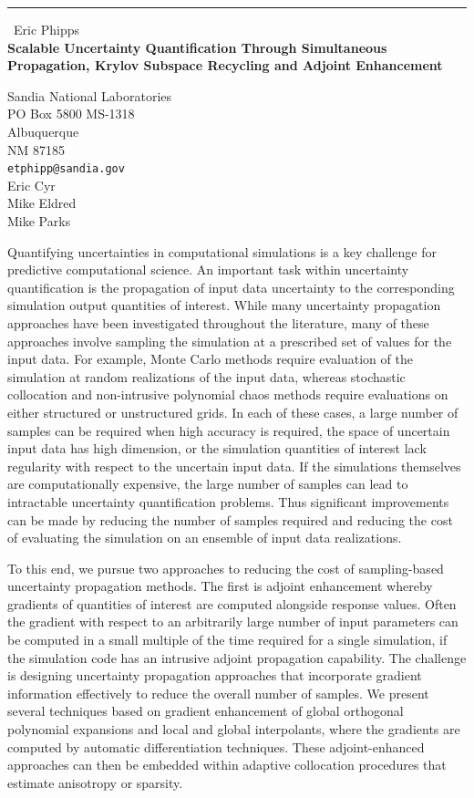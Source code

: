 \documentclass{report}
\begin{document}
\begin{center}
\rule{6in}{1pt} \
{\large Eric Phipps \\
{\bf Scalable Uncertainty Quantification Through Simultaneous Propagation, Krylov Subspace Recycling and Adjoint Enhancement}}

Sandia National Laboratories \\ PO Box 5800 MS-1318 \\ Albuquerque \\ NM 87185
\\
{\tt etphipp@sandia.gov}\\
Eric Cyr\\
Mike Eldred\\
Mike Parks\end{center}

Quantifying uncertainties in computational simulations is a key
challenge for predictive computational science. An important task
within uncertainty quantification is the propagation of input data
uncertainty to the corresponding simulation output quantities of
interest. While many uncertainty propagation approaches have been
investigated throughout the literature, many of these approaches
involve sampling the simulation at a prescribed set of values for the
input data. For example, Monte Carlo methods require evaluation of
the simulation at random realizations of the input data, whereas
stochastic collocation and non-intrusive polynomial chaos methods
require evaluations on either structured or unstructured grids. In
each of these cases, a large number of samples can be required when
high accuracy is required, the space of uncertain input data has high
dimension, or the simulation quantities of interest lack regularity
with respect to the uncertain input data. If the simulations
themselves are computationally expensive, the large number of samples
can lead to intractable uncertainty quantification problems. Thus
significant improvements can be made by reducing the number of samples
required and reducing the cost of evaluating the simulation on an
ensemble of input data realizations.

To this end, we pursue two approaches to reducing the cost of
sampling-based uncertainty propagation methods. The first is adjoint
enhancement whereby gradients of quantities of interest are computed
alongside response values. Often the gradient with respect to an
arbitrarily large number of input parameters can be computed in a
small multiple of the time required for a single simulation, if the
simulation code has an intrusive adjoint propagation capability. The
challenge is designing uncertainty propagation approaches that
incorporate gradient information effectively to reduce the overall
number of samples. We present several techniques based on gradient
enhancement of global orthogonal polynomial expansions and local and
global interpolants, where the gradients are
computed by automatic differentiation techniques. These
adjoint-enhanced approaches can then be embedded within adaptive
collocation procedures that estimate anisotropy or sparsity.
\end{document}
